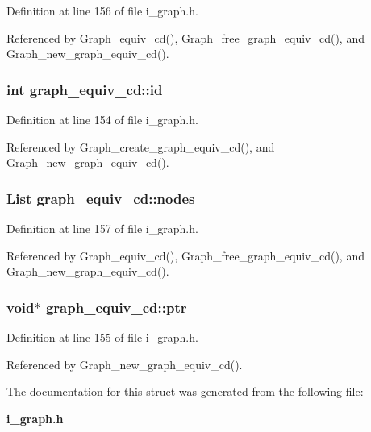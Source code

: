 Definition at line 156 of file i\_\-graph.h.

Referenced by Graph\_\-equiv\_\-cd(), Graph\_\-free\_\-graph\_\-equiv\_\-cd(), and Graph\_\-new\_\-graph\_\-equiv\_\-cd().
\subsubsection{\setlength{\rightskip}{0pt plus 5cm}int \bf{graph\_\-equiv\_\-cd::id}}\label{structgraph__equiv__cd_cf2188c276f2bec948330117f5e22d27}




Definition at line 154 of file i\_\-graph.h.

Referenced by Graph\_\-create\_\-graph\_\-equiv\_\-cd(), and Graph\_\-new\_\-graph\_\-equiv\_\-cd().
\subsubsection{\setlength{\rightskip}{0pt plus 5cm}\bf{List} \bf{graph\_\-equiv\_\-cd::nodes}}\label{structgraph__equiv__cd_5e3032a215f614821adc8d5560e742c0}




Definition at line 157 of file i\_\-graph.h.

Referenced by Graph\_\-equiv\_\-cd(), Graph\_\-free\_\-graph\_\-equiv\_\-cd(), and Graph\_\-new\_\-graph\_\-equiv\_\-cd().
\subsubsection{\setlength{\rightskip}{0pt plus 5cm}void$\ast$ \bf{graph\_\-equiv\_\-cd::ptr}}\label{structgraph__equiv__cd_14f3d69d384d0771f49947f676b66e61}




Definition at line 155 of file i\_\-graph.h.

Referenced by Graph\_\-new\_\-graph\_\-equiv\_\-cd().

The documentation for this struct was generated from the following file:\begin{CompactItemize}
\item 
\bf{i\_\-graph.h}\end{CompactItemize}
